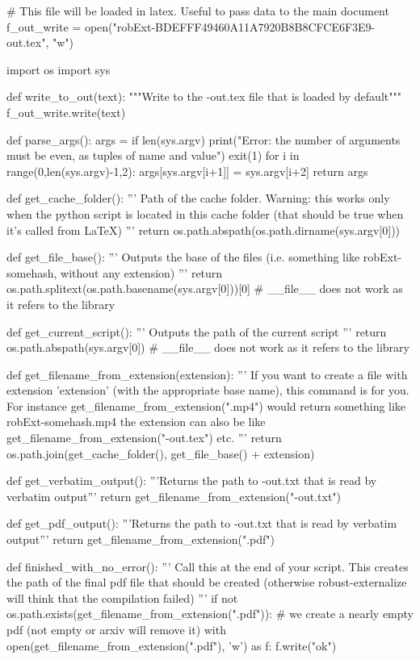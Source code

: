 
# This file will be loaded in latex. Useful to pass data to the main document
f_out_write = open("robExt-BDEFFF49460A11A7920B8B8CFCE6F3E9-out.tex", "w")

import os
import sys

def write_to_out(text):
    """Write to the -out.tex file that is loaded by default"""
    f_out_write.write(text)

def parse_args():
    args = {}
    if len(sys.argv) %
        print("Error: the number of arguments must be even, as tuples of name and value")
        exit(1)
    for i in range(0,len(sys.argv)-1,2):
        args[sys.argv[i+1]] = sys.argv[i+2]
    return args

def get_cache_folder():
    '''
    Path of the cache folder. Warning: this works only when the python script
    is located in this cache folder (that should be true when it's called from LaTeX)
    '''
    return os.path.abspath(os.path.dirname(sys.argv[0]))

def get_file_base():
    '''
    Outputs the base of the files (i.e. something like robExt-somehash, without any extension)
    '''
    return os.path.splitext(os.path.basename(sys.argv[0]))[0] # __file__ does not work as it refers to the library

def get_current_script():
    '''
    Outputs the path of the current script
    '''
    return os.path.abspath(sys.argv[0]) # __file__ does not work as it refers to the library


def get_filename_from_extension(extension):
    '''
    If you want to create a file with extension 'extension' (with the appropriate base name), this command
    is for you. For instance get_filename_from_extension(".mp4") would return something like
    robExt-somehash.mp4
    the extension can also be like get_filename_from_extension("-out.tex") etc.
    '''
    return os.path.join(get_cache_folder(), get_file_base() + extension)

def get_verbatim_output():
    '''Returns the path to -out.txt that is read by verbatim output'''
    return get_filename_from_extension("-out.txt")

def get_pdf_output():
    '''Returns the path to -out.txt that is read by verbatim output'''
    return get_filename_from_extension(".pdf")


def finished_with_no_error():
    '''
    Call this at the end of your script. This creates the path of the final pdf file that should be
    created (otherwise robust-externalize will think that the compilation failed)
    '''
    if not os.path.exists(get_filename_from_extension(".pdf")):
        # we create a nearly empty pdf (not empty or arxiv will remove it)
        with open(get_filename_from_extension(".pdf"), 'w') as f:
            f.write("ok")

